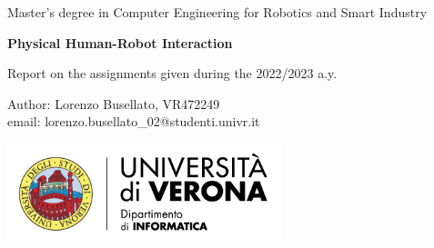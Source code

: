 \documentclass{article}
\numberwithin{equation}{section}
\newcommand\blankpage{%
    \null
    \thispagestyle{empty}%
    \addtocounter{page}{-1}%
    \newpage}
\begin{document}
\afterpage{\blankpage}
\begin{titlepage}
\begin{center}
\huge Master's degree in Computer Engineering for Robotics and Smart Industry
\end{center}
\vspace*{\fill}
\begin{center}
\textbf{\Huge Physical Human-Robot Interaction}
\end{center}
\begin{center}
Report on the assignments given during the 2022/2023 a.y.
\end{center}
\vspace*{\fill}
\begin{center}
\begin{minipage}{0.4\textwidth}
\begin{flushleft}
Author: Lorenzo Busellato, VR472249\\
email: lorenzo.busellato\_02@studenti.univr.it
\end{flushleft}
\end{minipage}
\begin{minipage}{0.5\textwidth}
\begin{flushright}
\includegraphics[keepaspectratio,width=0.6\textwidth]{logo}
\end{flushright}
\end{minipage}

\end{center}
\vspace{1cm}
\end{titlepage}


\afterpage{\blankpage}
\thispagestyle{empty}
\setcounter{page}{0}
\renewcommand{\cftsecleader}{\cftdotfill{\cftdotsep}}
\setcounter{tocdepth}{2}
\tableofcontents
\clearpage

\fancyhead[R]{}
\fancyhead[L]{}
\pagestyle{fancy}



\newpage



\newpage



\newpage



\newpage



\newpage



\newpage


\end{document}
